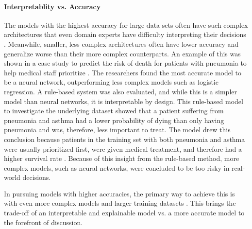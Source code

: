 \paragraph{Interpretablity vs. Accuracy\\}
The models with the highest accuracy for large data sets often have such complex architectures that even domain experts have difficulty interpreting their decisions \cite{caruanaIntelligibleModelsHealthCare2015}. Meanwhile, smaller, less complex architectures often have lower accuracy and generalize worse than their more complex counterparts. An example of this was shown in a case study to predict the risk of death for patients with pneumonia to help medical staff prioritize \cite{cooperPredictingDireOutcomes2005}. The researchers found the most accurate model to be a neural network, outperforming less complex models such as logistic regression. A rule-based system was also evaluated, and while this is a simpler model than neural networks, it is interpretable by design. This rule-based model to investigate the underlying dataset showed that a patient suffering from pneumonia and asthma had a lower probability of dying than only having pneumonia and was, therefore, less important to treat. The model drew this conclusion because patients in the training set with both pneumonia and asthma were usually prioritized first, were given medical treatment, and therefore had a higher survival rate \cite{cooperEvaluationMachinelearningMethods1997}. Because of this insight from the rule-based method, more complex models, such as neural networks, were concluded to be too risky in real-world decisions.

In pursuing models with higher accuracies, the primary way to achieve this is with even more complex models and larger training datasets \cite{bianchiniComplexityNeuralNetwork2014}. This brings the trade-off of an interpretable and explainable model vs. a more accurate model \cite{barredoarrietaExplainableArtificialIntelligence2020} to the forefront of discussion. 


